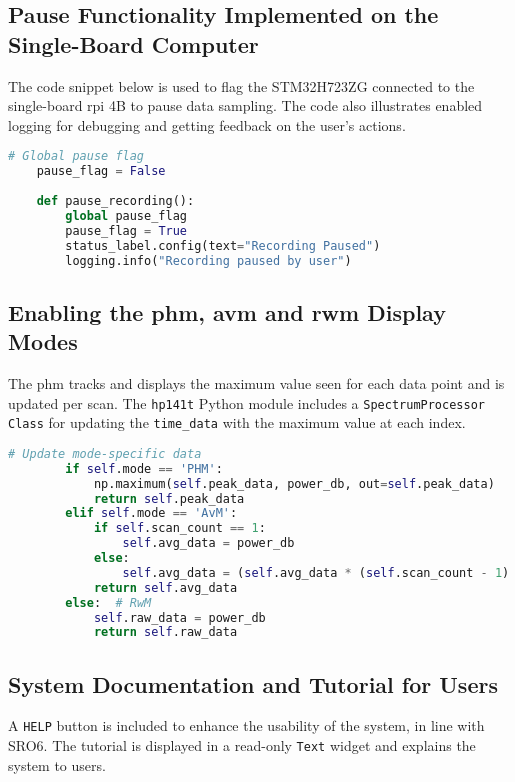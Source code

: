 \documentclass[class=report,11pt,crop=false]{standalone}
\begin{document}
	\subsection{Pause Functionality Implemented on the Single-Board Computer}
	The code snippet below is used to flag the STM32H723ZG connected to the single-board \acrshort{rpi} 4B to pause data sampling. The code also illustrates enabled logging for debugging and getting feedback on the user's actions.
	\begin{lstlisting}[language=Python, caption={Code snippet for function associated with the pause function in latex.}, label={lst:guis-pause-function}]
	# Global pause flag
	pause_flag = False
	
	def pause_recording():
		global pause_flag
		pause_flag = True
		status_label.config(text="Recording Paused")
		logging.info("Recording paused by user")
	\end{lstlisting}

	\subsection{Enabling the \acrfull{phm}, \acrfull{avm} and \acrfull{rwm} Display Modes}
	The \acrshort{phm} tracks and displays the maximum value seen for each data point and is updated per scan. The \texttt{hp141t} Python module includes a \texttt{SpectrumProcessor Class} for updating the \texttt{time\_data} with the maximum value at each index. 
	
	\begin{lstlisting}[language=Python, caption={Code snippet for enabling the \acrshort{phm} when the user presses the \texttt{PHM} button on the screen.}, label={lst:guis-phm}]
		 # Update mode-specific data
		if self.mode == 'PHM':
			np.maximum(self.peak_data, power_db, out=self.peak_data)
			return self.peak_data
		elif self.mode == 'AvM':
			if self.scan_count == 1:
				self.avg_data = power_db
			else:
				self.avg_data = (self.avg_data * (self.scan_count - 1) + power_db) / self.scan_count
			return self.avg_data
		else:  # RwM
			self.raw_data = power_db
			return self.raw_data
	\end{lstlisting} 

	\subsection{System Documentation and Tutorial for Users}
	
	A \texttt{HELP} button is included to enhance the usability of the system, in line with SRO6. The tutorial is displayed in a read-only \texttt{Text} widget and explains the system to users.
	
\end{document}
